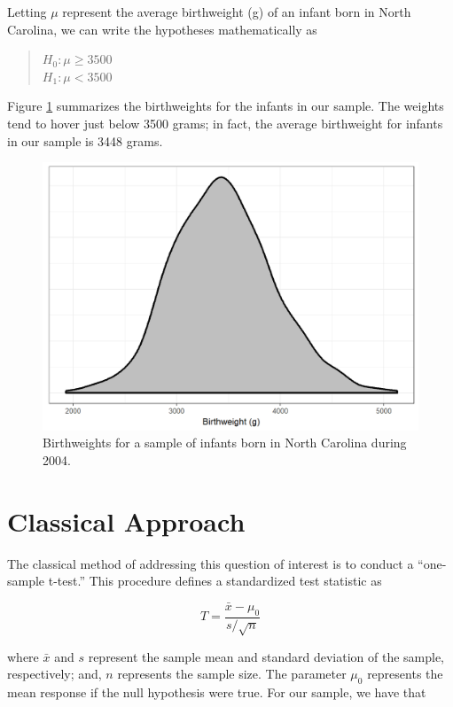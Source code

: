 \documentclass[]{book}
\theoremstyle{definition}
\theoremstyle{definition}
\theoremstyle{definition}
\theoremstyle{remark}
\begin{document}
Letting \(\mu\) represent the average birthweight (g) of an infant born
in North Carolina, we can write the hypotheses mathematically as

\begin{quote}
\(H_0: \mu \geq 3500\)\\
\(H_1: \mu < 3500\)
\end{quote}

Figure \ref{fig:onemean-plot} summarizes the birthweights for the
infants in our sample. The weights tend to hover just below 3500 grams;
in fact, the average birthweight for infants in our sample is 3448
grams.

\begin{figure}

{\centering \includegraphics[width=0.8\linewidth]{./Images/onemean-plot-1} 

}

\caption{Birthweights for a sample of infants born in North Carolina during 2004.}\label{fig:onemean-plot}
\end{figure}

\section{Classical Approach}\label{classical-approach}

The classical method of addressing this question of interest is to
conduct a ``one-sample t-test.'' This procedure defines a standardized
test statistic as

\[T = \frac{\bar{x} - \mu_0}{s/\sqrt{n}}\]

where \(\bar{x}\) and \(s\) represent the sample mean and standard
deviation of the sample, respectively; and, \(n\) represents the sample
size. The parameter \(\mu_0\) represents the mean response if the null
hypothesis were true. For our sample, we have that
\end{document}
